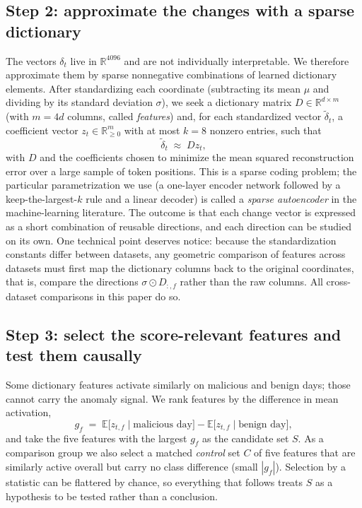 \documentclass[10pt]{article}
\begin{document}
\subsection{Step 2: approximate the changes with a sparse dictionary}

The vectors $\delta_t$ live in $\mathbb{R}^{4096}$ and are not
individually interpretable. We therefore approximate them by sparse
nonnegative combinations of learned dictionary elements. After
standardizing each coordinate (subtracting its mean $\mu$ and dividing
by its standard deviation $\sigma$), we seek a dictionary matrix
$D \in \mathbb{R}^{d \times m}$ (with $m = 4d$ columns, called
\emph{features}) and, for each standardized vector
$\tilde\delta_t$, a coefficient vector
$z_t \in \mathbb{R}^{m}_{\geq 0}$ with at most $k = 8$ nonzero
entries, such that
\begin{equation}
\tilde\delta_t \;\approx\; D z_t ,
\end{equation}
with $D$ and the coefficients chosen to minimize the mean squared
reconstruction error over a large sample of token positions. This is a
sparse coding problem; the particular parametrization we use (a
one-layer encoder network followed by a keep-the-largest-$k$ rule and a
linear decoder) is called a \emph{sparse autoencoder} in the
machine-learning literature. The outcome is that each change vector is
expressed as a short combination of reusable directions, and each
direction can be studied on its own. One technical point deserves
notice: because the standardization constants differ between datasets,
any geometric comparison of features across datasets must first map the
dictionary columns back to the original coordinates, that is, compare
the directions $\sigma \odot D_{:,f}$ rather than the raw columns. All
cross-dataset comparisons in this paper do so.

\subsection{Step 3: select the score-relevant features and test them
causally}
\label{sec:interventions}

Some dictionary features activate similarly on malicious and benign
days; those cannot carry the anomaly signal. We rank features by the
difference in mean activation,
\begin{equation}
g_f \;=\; \mathbb{E}\bigl[z_{t,f} \mid \text{malicious day}\bigr] -
\mathbb{E}\bigl[z_{t,f} \mid \text{benign day}\bigr],
\end{equation}
and take the five features with the largest $g_f$ as the candidate set
$S$. As a comparison group we also select a matched \emph{control} set
$C$ of five features that are similarly active overall but carry no
class difference (small $|g_f|$). Selection by a statistic can be
flattered by chance, so everything that follows treats $S$ as a
hypothesis to be tested rather than a conclusion.
\end{document}
